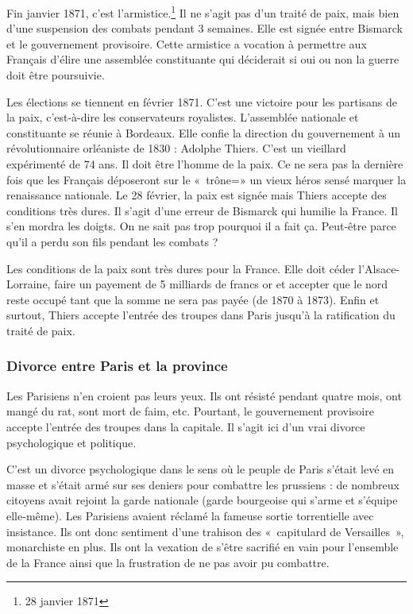 \documentclass[12pt]{report}
\begin{document}
Fin janvier 1871, c'est l'armistice.\footnote{28 janvier 1871}
Il ne s'agit pas d'un traité de paix, mais bien d'une suspension des combats pendant 3 semaines.
Elle est signée entre Bismarck et le gouvernement provisoire.
Cette armistice a vocation à permettre aux Français d'élire une assemblée constituante qui déciderait si oui ou non la guerre doit être poursuivie.

Les élections se tiennent en février 1871.
C’est une victoire pour les partisans de la paix, c’est-à-dire les conservateurs royalistes. 
L’assemblée nationale et constituante se réunie à Bordeaux.
Elle confie la direction du gouvernement à un révolutionnaire orléaniste de 1830 : Adolphe Thiers. 
C’est un vieillard expérimenté de 74 ans. 
Il doit être l’homme de la paix. 
Ce ne sera pas la dernière fois que les Français déposeront sur le «~trône=» un vieux héros sensé marquer la renaissance nationale. 
Le 28 février, la paix est signée mais Thiers accepte des conditions très dures. 
Il s’agit d’une erreur de Bismarck qui humilie la France. 
Il s’en mordra les doigts. 
On ne sait pas trop pourquoi il a fait ça. 
Peut-être parce qu’il a perdu son fils pendant les combats ?

Les conditions de la paix sont très dures pour la France.
Elle doit céder l'Alsace-Lorraine, faire un payement de 5 milliards de francs or et accepter que le nord reste occupé tant que la somme ne sera pas payée (de 1870 à 1873).
Enfin et surtout, Thiers accepte l'entrée des troupes dans Paris jusqu'à la ratification du traité de paix.

\subsubsection{Divorce entre Paris et la province}

Les Parisiens n’en croient pas leurs yeux. Ils ont résisté pendant quatre mois, ont mangé du rat, sont mort de faim, etc. 
Pourtant, le gouvernement provisoire accepte l’entrée des troupes dans la capitale. 
Il s’agit ici d’un vrai divorce psychologique et politique.

C'est un divorce psychologique dans le sens où le peuple de Paris s’était levé en masse et s’était armé
sur ses deniers pour combattre les prussiens : de nombreux citoyens avait rejoint la
garde nationale (garde bourgeoise qui s’arme et s’équipe elle-même). Les Parisiens
avaient réclamé la fameuse sortie torrentielle avec insistance. Ils ont donc sentiment
d’une trahison des «~capitulard de Versailles~», monarchiste en plus. Ils ont la vexation
de s’être sacrifié en vain pour l’ensemble de la France ainsi que la frustration de ne
pas avoir pu combattre.
\end{document}
